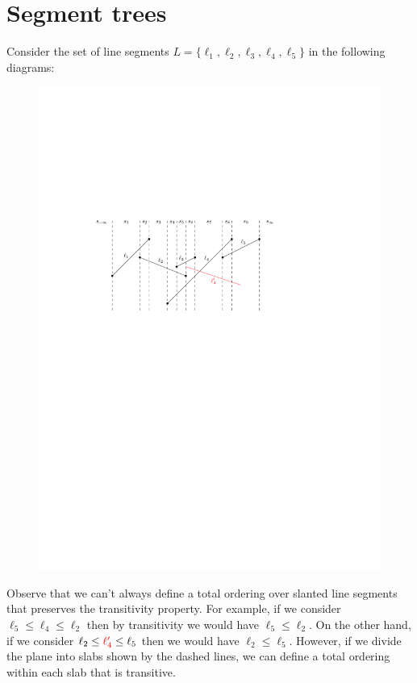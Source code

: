 \section{Segment trees}
\label{sec:segmenet-trees}

Consider the set of line segments $L = \{ \ell_1, \ell_2, \ell_3, \ell_4, \ell_5\}$ in the following diagrams: 

\begin{figure}[h!]
\centering
\includegraphics[scale = .8]{ipe/slanted-lines.pdf}
\end{figure}
Observe that we can't always define a total ordering over slanted line segments that preserves the transitivity property. 
%
For example, if we consider $\ell_5 \leq \ell_4 \leq \ell_2$ then by transitivity we would have $\ell_5 \leq \ell_2$. 
%
On the other hand, if we consider $\ell_2 \leq \textcolor{red}{\ell'_4} \leq \ell_5$ then we would have $\ell _2 \leq \ell_5$. 
%
However, if we divide the plane into slabs shown by the dashed lines, we can define a total ordering within each slab that is transitive. 

